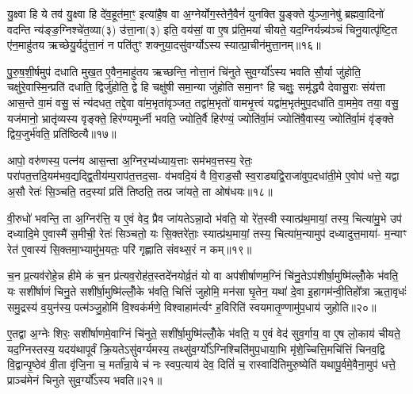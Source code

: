 यु॒क्ष्वा हि ये तव॑ यु॒क्ष्वा हि दे॑व॒हूत॑मा॒ꣳ॒ इत्या॑है॒ष वा अ॒ग्नेर्योग॒स्तेनै॒वैनं॑ युनक्ति यु॒ङ्क्ते यु॑ञ्जा॒नेषु॑ ब्रह्मवा॒दिनो॑ वदन्ति न्य॑ङ्ङ॒ग्निश्चे॑त॒व्या(३) उ॑त्ता॒ना(३) इति॒ वय॑सां॒ वा ए॒ष प्र॑ति॒मया॑ चीयते॒ यद॒ग्निर्यन्न्य॑ञ्चं चिनु॒यात्पृ॑ष्टि॒त ए॑न॒माहु॑तय ऋच्छेयु॒र्यदु॑त्ता॒नं न पति॑तुꣳ शक्नुया॒दसु॑वर्ग्यो\-ऽस्य स्यात्प्रा॒चीन॑मुत्ता॒नम्॥१६॥

पु॒रु॒ष॒शी॒र्\mbox{}षमुप॑ दधाति मुख॒त ए॒वैन॒माहु॑तय ऋच्छन्ति॒ नोत्ता॒नं चि॑नुते सुव॒र्ग्यो᳚\-ऽस्य भवति सौ॒र्या जु॑होति॒ चक्षु॑रे॒वास्मि॒न्प्रति॑ दधाति॒ द्विर्जु॑होति॒ द्वे हि चक्षु॑षी समा॒न्या जु॑होति समा॒नꣳ हि चक्षुः॒ समृ॑द्ध्यै देवासु॒राः संय॑त्ता आस॒न्ते वा॒मं वसु॒ सं न्य॑दधत॒ तद्दे॒वा वा॑म॒भृता॑वृञ्जत॒ तद्वा॑म॒भृतो॑ वामभृ॒त्त्वं यद्वा॑म॒भृत॑मुप॒दधा॑ति वा॒ममे॒व तया॒ वसु॒ यज॑मानो॒ भ्रातृ॑व्यस्य वृङ्क्ते॒ हिर॑ण्यमूर्ध्नी भवति॒ ज्योति॒र्वै हिर॑ण्यं॒ ज्योति॑र्वा॒मं ज्योति॑षै॒वास्य॒ ज्योति॑र्वा॒मं वृ॑ङ्क्ते द्विय॒जुर्भ॑वति॒ प्रति॑ष्ठित्यै॥१७॥

{\anuvakamend[{यु॒ञ्जा॒नेष्वग्ने᳚ प्रा॒चीन॑मुत्ता॒नं वा॑म॒भृत॒ञ्चतु॑र्विꣳशतिश्च॥३॥}]}

आपो॒ वरु॑णस्य॒ पत्न॑य आस॒न्ता अ॒ग्निर॒भ्य॑ध्याय॒त्ताः सम॑भव॒त्तस्य॒ रेतः॒ परा॑पत॒त्तदि॒यम॑भव॒द्यद्द्वि॒तीय॑म्प॒राप॑त॒त्तद॒सा- व॑भवदि॒यं वै वि॒राड॒सौ स्व॒राड्यद्वि॒राजा॑वुप॒दधा॑ती॒मे ए॒वोप॑ धत्ते॒ यद्वा अ॒सौ रेतः॑ सि॒ञ्चति॒ तद॒स्यां प्रति॑ तिष्ठति॒ तत्प्र जा॑यते॒ ता ओष॑धयः॥१८॥

वी॒रुधो॑ भवन्ति॒ ता अ॒ग्निर॑त्ति॒ य ए॒वं वेद॒ प्रैव जा॑यते\-ऽन्ना॒दो भ॑वति॒ यो रे॑त॒स्वी स्यात्प्र॑थ॒मायां॒ तस्य॒ चित्या॑मु॒भे उप॑ दध्यादि॒मे ए॒वास्मै॑ स॒मीची॒ रेतः॑ सिञ्चतो॒ यः सि॒क्तरे॑ताः॒ स्यात्प्र॑थ॒मायां॒ तस्य॒ चित्या॑म॒न्यामुप॑ दध्यादुत्त॒माया॑- म॒न्याꣳ रेत॑ ए॒वास्य॑ सि॒क्तमा॒भ्यामु॑भ॒यतः॒ परि॑ गृह्णाति संवथ्स॒रं न कम्॥१९॥

च॒न प्र॒त्यव॑रोहे॒न्न हीमे कं च॒न प्र॑त्यव॒रोह॑त॒स्तदे॑नयोर्व्र॒तं यो वा अप॑शीर्\mbox{}षाणम॒ग्निं चि॑नु॒ते\-ऽप॑शीर्\mbox{}षा॒मुष्मि॑ल्लोँ॒के भ॑वति॒ यः सशी॑र्\mbox{}षाणं चिनु॒ते सशी॑र्\mbox{}षा॒मुष्मि॑ल्लोँ॒के भ॑वति॒ चित्तिं॑ जुहोमि॒ मन॑सा घृ॒तेन॒ यथा॑ दे॒वा इ॒हागम॑न्वी॒तिहो᳚त्रा ऋता॒वृधः॑ समु॒द्रस्य॑ व॒युन॑स्य॒ पत्म॑ञ्जु॒होमि॑ वि॒श्वक॑र्मणे॒ विश्वाहाम॑र्त्यꣳ ह॒विरिति॑ स्वयमातृ॒ण्णामु॑प॒धाय॑ जुहोति॥२०॥

ए॒तद्वा अ॒ग्नेः शिरः॒ सशी॑र्\mbox{}षाणमे॒वाग्निं चि॑नुते॒ सशी॑र्\mbox{}षा॒मुष्मि॑ल्लोँ॒के भ॑वति॒ य ए॒वं वेद॑ सुव॒र्गाय॒ वा ए॒ष लो॒काय॑ चीयते॒ यद॒ग्निस्तस्य॒ यदय॑थापूर्वं क्रि॒यते\-ऽसु॑वर्ग्यमस्य॒ तथ्सु॑व॒र्ग्यो᳚\-ऽग्निश्चिति॑मुप॒धाया॒भि मृ॑शे॒च्चित्ति॒मचि॑त्तिं चिनव॒द्वि वि॒द्वान्पृ॒ष्ठेव॑ वी॒ता वृ॑जि॒ना च॒ मर्ता᳚न्रा॒ये च॑ नः स्वप॒त्याय॑ देव॒ दितिं॑ च॒ रास्वादि॑तिमुरु॒ष्येति॑ यथापू॒र्वमे॒वैना॒मुप॑ धत्ते॒ प्राञ्च॑मेनं चिनुते सुव॒र्ग्यो᳚\-ऽस्य भवति॥२१॥


